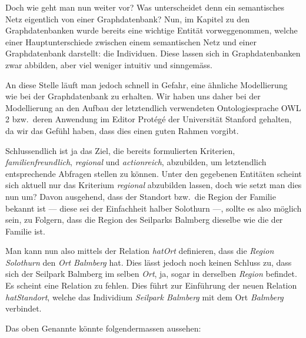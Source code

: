 Doch wie geht man nun weiter vor? Was unterscheidet denn ein semantisches Netz eigentlich von einer Graphdatenbank? Nun, im Kapitel zu den Graphdatenbanken wurde bereits eine wichtige Entität vorweggenommen, welche einer Hauptunterschiede zwischen einem semantischen Netz und einer Graphdatenbank darstellt: die Individuen. Diese lassen sich in Graphdatenbanken zwar abbilden, aber viel weniger intuitiv und sinngemäss.

An diese Stelle läuft man jedoch schnell in Gefahr, eine ähnliche Modellierung wie bei der Graphdatenbank zu erhalten. Wir haben uns daher bei der Modellierung an den Aufbau der letztendlich verwendeten Ontologiesprache OWL 2 bzw.\ deren Anwendung im Editor Protégé der Universität Stanford gehalten, da wir das Gefühl haben, dass dies einen guten Rahmen vorgibt.

Schlussendlich ist ja das Ziel, die bereits formulierten Kriterien, \textit{familienfreundlich}, \textit{regional} und \textit{actionreich}, abzubilden, um letztendlich entsprechende Abfragen stellen zu können. Unter den gegebenen Entitäten scheint sich aktuell nur das Kriterium \textit{regional} abzubilden lassen, doch wie setzt man dies nun um? Davon ausgehend, dass der Standort bzw.\ die Region der Familie bekannt ist --- diese sei der Einfachheit halber Solothurn ---, sollte es also möglich sein, zu Folgern, dass die Region des Seilparks Balmberg dieselbe wie die der Familie ist.

Man kann nun also mittels der Relation \textit{hatOrt} definieren, dass die \textit{Region} \textit{Solothurn} den \textit{Ort} \textit{Balmberg} hat. Dies lässt jedoch noch keinen Schluss zu, dass sich der Seilpark Balmberg im selben \textit{Ort}, ja, sogar in derselben \textit{Region} befindet. Es scheint eine Relation zu fehlen. Dies führt zur Einführung der neuen Relation \textit{hatStandort}, welche das Individium \textit{Seilpark Balmberg} mit dem Ort \textit{Balmberg} verbindet.

\newpage

Das oben Genannte könnte folgendermassen aussehen:

